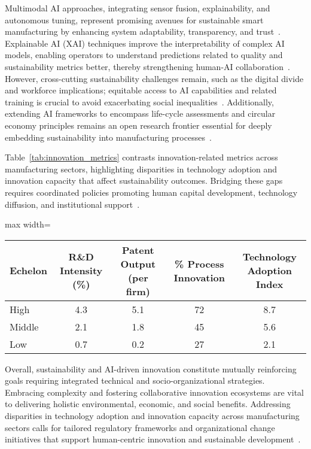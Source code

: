 \documentclass[sigconf]{acmart}
\begin{document}
Multimodal AI approaches, integrating sensor fusion, explainability, and autonomous tuning, represent promising avenues for sustainable smart manufacturing by enhancing system adaptability, transparency, and trust~\cite{ref5,ref30}. Explainable AI (XAI) techniques improve the interpretability of complex AI models, enabling operators to understand predictions related to quality and sustainability metrics better, thereby strengthening human-AI collaboration~\cite{ref30}. However, cross-cutting sustainability challenges remain, such as the digital divide and workforce implications; equitable access to AI capabilities and related training is crucial to avoid exacerbating social inequalities~\cite{ref5}. Additionally, extending AI frameworks to encompass life-cycle assessments and circular economy principles remains an open research frontier essential for deeply embedding sustainability into manufacturing processes~\cite{ref38}.

Table~\ref{tab:innovation_metrics} contrasts innovation-related metrics across manufacturing sectors, highlighting disparities in technology adoption and innovation capacity that affect sustainability outcomes. Bridging these gaps requires coordinated policies promoting human capital development, technology diffusion, and institutional support~\cite{ref21}.

\begin{table*}[htbp]
\centering
\caption{Innovation and Technology Adoption Metrics Across Manufacturing Development Echelons~\cite{ref21}}
\label{tab:innovation_metrics}
\begin{adjustbox}{max width=\textwidth}
\begin{tabular}{@{}lcccc@{}}
\toprule
Echelon & R\&D Intensity (\%) & Patent Output (per firm) & \% Process Innovation & Technology Adoption Index \\ \midrule
High & 4.3 & 5.1 & 72 & 8.7 \\
Middle & 2.1 & 1.8 & 45 & 5.6 \\
Low & 0.7 & 0.2 & 27 & 2.1 \\ \bottomrule
\end{tabular}
\end{adjustbox}
\end{table*}

Overall, sustainability and AI-driven innovation constitute mutually reinforcing goals requiring integrated technical and socio-organizational strategies. Embracing complexity and fostering collaborative innovation ecosystems are vital to delivering holistic environmental, economic, and social benefits. Addressing disparities in technology adoption and innovation capacity across manufacturing sectors calls for tailored regulatory frameworks and organizational change initiatives that support human-centric innovation and sustainable development~\cite{ref21}.
\end{document}
